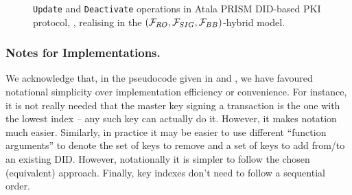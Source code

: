 \begin{figure}[ht!]
  \caption{\texttt{Update} and \texttt{Deactivate} operations in Atala
    PRISM DID-based PKI protocol, \RealPKIDIDAtala, realising \IdealFPKIDID
    in the $(\mathcal{F}_{RO},\mathcal{F}_{SIG},\mathcal{F}_{BB})$-hybrid model.}
  \label{fig:atalapkidid2}
\end{figure}

\subsubsection{Notes for Implementations.} %

We acknowledge that, in the pseudocode given in  and
, we have favoured notational simplicity over
implementation efficiency or
convenience. For instance, it is not really needed that the master key signing a
transaction is the one with the lowest index -- any such key can actually do it.
However, it makes notation much easier. Similarly, in practice it may be easier
to use different ``function arguments'' to denote the set of keys to remove and
a set of keys to add from/to an existing DID. However, notationally it is
simpler to follow the chosen (equivalent) approach. Finally, key indexes don't
need to follow a sequential order.

